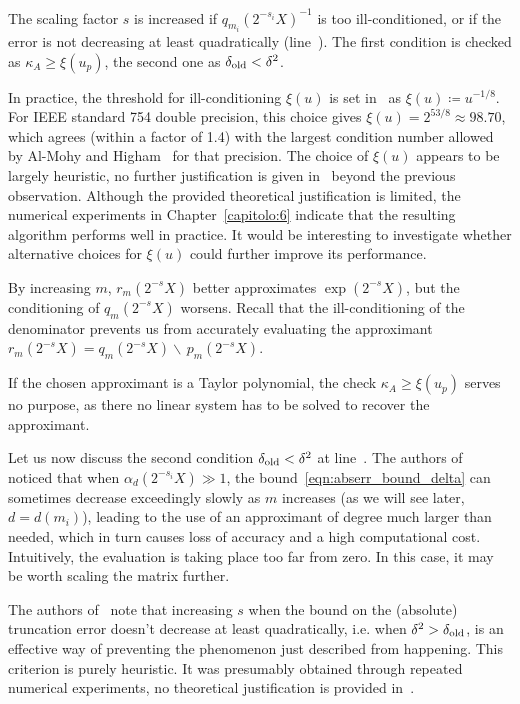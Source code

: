 The scaling factor $s$ is increased if $q_{m_i}(2^{-s_i}X)^{-1}$ is too ill-conditioned, or if the error is not decreasing at least quadratically (line~). The first condition is checked as $\kappa_A\ge\xi(u_p)$, the second one as $\delta_{\textup{old}}<\delta^2$. 

In practice, the threshold for ill-conditioning $\xi(u)$ is set in~\cite{higham:hf19_mpexpm} as $\xi(u)\coloneqq u^{-1/8}$. For \textsc{IEEE} standard 754 double precision, this choice gives $\xi(u)=2^{53/8}\approx 98.70$, which agrees (within a factor of 1.4) with the largest condition number allowed by Al-Mohy and Higham~\cite[Table~3.1]{higham:alhi09_new} for that precision. The choice of $\xi(u)$ appears to be largely heuristic, no further justification is given in~\cite{higham:hf19_mpexpm} beyond the previous observation. Although the provided theoretical justification is limited, the numerical experiments in Chapter~\ref{capitolo:6} indicate that the resulting algorithm performs well in practice. It would be interesting to investigate whether alternative choices for $\xi(u)$ could further improve its performance.

By increasing $m$, $r_m(2^{-s}X)$ better approximates $\exp(2^{-s}X)$, but the conditioning of $q_m(2^{-s}X)$ worsens. Recall that the ill-conditioning of the denominator prevents us from accurately evaluating the approximant $r_m(2^{-s}X)=q_m(2^{-s}X)\backslash\,p_m(2^{-s}X)$. 
\begin{oss}\label{oss:kappa_A_taylor}
	If the chosen approximant is a Taylor polynomial, the check $\kappa_A\ge\xi(u_p)$ serves no purpose, as there no linear system has to be solved to recover the approximant. 
\end{oss}

Let us now discuss the second condition $\delta_{\textup{old}}<\delta^2$ at line~.
The authors of~\cite{higham:hf19_mpexpm} noticed that when $\alpha_d(2^{-s_i}X)\gg 1$, the bound~\eqref{eqn:abserr_bound_delta} can sometimes decrease exceedingly slowly as $m$ increases (as we will see later, $d=d(m_i)$), leading to the use of an approximant of degree much larger than needed, which in turn causes loss of accuracy and a high computational cost. Intuitively, the evaluation is taking place too far from zero. In this case, it may be worth scaling the matrix further. 

The authors of~\cite{higham:hf19_mpexpm} note that increasing $s$ when the bound on the (absolute) truncation error doesn't decrease at least quadratically, i.e. when $\delta^2>\delta_{\textup{old}}$, is an effective way of preventing the phenomenon just described from happening. This criterion is purely heuristic. It was presumably obtained through repeated numerical experiments, no theoretical justification is provided in~\cite{higham:hf19_mpexpm}.
\smallskip 

